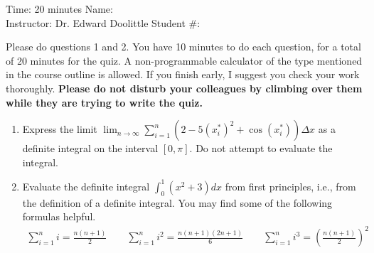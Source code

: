 \documentclass[12pt]{article}
\newcommand{\ds}{\displaystyle}
\begin{document}
\thispagestyle{plain}

\begin{flushleft}
Time:  20 minutes                \hfill       Name: \underline{\hspace{2in}} \\
Instructor: Dr. Edward Doolittle \hfill Student \#: \underline{\hspace{2in}}
\end{flushleft}

\noindent
Please do questions 1 and 2.  You have 10 minutes
to do each question, for a total of 20
minutes for the quiz.  A non-programmable
calculator of the type mentioned in the course outline is allowed.
If you finish early, I suggest you check your work thoroughly.
\textbf{Please do not disturb your colleagues by climbing over them while
they are trying to write the quiz.}

\begin{enumerate}
\item Express 
  the limit
  $\ds\lim_{n\to\infty}\sum_{i=1}^n
    \left(2-5(x_i^*)^2+\cos(x_i^*)\right) \Delta x$ 
  as a definite integral on the interval $[0,\pi]$.  
  Do not attempt to evaluate the integral.
\vfill
\newpage
\item Evaluate 
  the definite integral $\ds \int_0^1 (x^2+3) dx$ from first principles,
  i.e., from the definition of a definite integral.  You may find some of
  the following formulas helpful.
  \begin{align*}
    \sum_{i=1}^n i = \frac{n(n+1)}{2}
    \qquad
    \sum_{i=1}^n i^2 = \frac{n(n+1)(2n+1)}{6}
    \qquad
    \sum_{i=1}^n i^3 = \left(\frac{n(n+1)}{2}\right)^2
  \end{align*}
\vfill
\end{enumerate}
\end{document}
